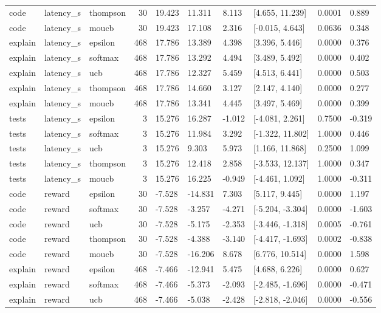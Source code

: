 \begin{tabular}{lllrllllll}
code & latency_s & thompson & 30 & 19.423 & 11.311 & 8.113 & [4.655, 11.239] & 0.0001 & 0.889 \\
code & latency_s & moucb & 30 & 19.423 & 17.108 & 2.316 & [-0.015, 4.643] & 0.0636 & 0.348 \\
explain & latency_s & epsilon & 468 & 17.786 & 13.389 & 4.398 & [3.396, 5.446] & 0.0000 & 0.376 \\
explain & latency_s & softmax & 468 & 17.786 & 13.292 & 4.494 & [3.489, 5.492] & 0.0000 & 0.402 \\
explain & latency_s & ucb & 468 & 17.786 & 12.327 & 5.459 & [4.513, 6.441] & 0.0000 & 0.503 \\
explain & latency_s & thompson & 468 & 17.786 & 14.660 & 3.127 & [2.147, 4.140] & 0.0000 & 0.277 \\
explain & latency_s & moucb & 468 & 17.786 & 13.341 & 4.445 & [3.497, 5.469] & 0.0000 & 0.399 \\
tests & latency_s & epsilon & 3 & 15.276 & 16.287 & -1.012 & [-4.081, 2.261] & 0.7500 & -0.319 \\
tests & latency_s & softmax & 3 & 15.276 & 11.984 & 3.292 & [-1.322, 11.802] & 1.0000 & 0.446 \\
tests & latency_s & ucb & 3 & 15.276 & 9.303 & 5.973 & [1.166, 11.868] & 0.2500 & 1.099 \\
tests & latency_s & thompson & 3 & 15.276 & 12.418 & 2.858 & [-3.533, 12.137] & 1.0000 & 0.347 \\
tests & latency_s & moucb & 3 & 15.276 & 16.225 & -0.949 & [-4.461, 1.092] & 1.0000 & -0.311 \\
code & reward & epsilon & 30 & -7.528 & -14.831 & 7.303 & [5.117, 9.445] & 0.0000 & 1.197 \\
code & reward & softmax & 30 & -7.528 & -3.257 & -4.271 & [-5.204, -3.304] & 0.0000 & -1.603 \\
code & reward & ucb & 30 & -7.528 & -5.175 & -2.353 & [-3.446, -1.318] & 0.0005 & -0.761 \\
code & reward & thompson & 30 & -7.528 & -4.388 & -3.140 & [-4.417, -1.693] & 0.0002 & -0.838 \\
code & reward & moucb & 30 & -7.528 & -16.206 & 8.678 & [6.776, 10.514] & 0.0000 & 1.598 \\
explain & reward & epsilon & 468 & -7.466 & -12.941 & 5.475 & [4.688, 6.226] & 0.0000 & 0.627 \\
explain & reward & softmax & 468 & -7.466 & -5.373 & -2.093 & [-2.485, -1.696] & 0.0000 & -0.471 \\
explain & reward & ucb & 468 & -7.466 & -5.038 & -2.428 & [-2.818, -2.046] & 0.0000 & -0.556 \\

\end{tabular}
